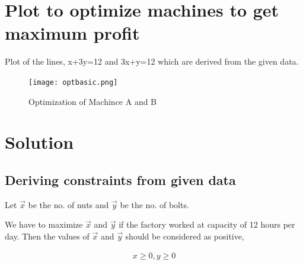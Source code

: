 \documentclass[journal,10pt,twocolumn]{article}
\begin{document}
\section{Plot to optimize machines to get maximum profit}
\vspace{0.25cm}
Plot of the lines, x+3y=12 and 3x+y=12 which are derived from the given data.
\begin{figure}[h]
\texttt{[image: optbasic.png]}
\caption{Optimization of Machince A and B}
\label{Optimization of Machince A and B}
\end{figure}

\section{Solution}
\subsection{Deriving constraints from given data}
\begin{flushleft}
Let $\vec{x}$ be the no. of nuts and $\vec{y}$ be the no. of bolts.\\
\end{flushleft}
\vspace{0.25cm}

\begin{flushleft}
We have to maximize $\vec{x}$ and $\vec{y}$ if the factory worked at capacity of 12 hours per day. Then the values of $\vec{x}$ and $\vec{y}$ should be considered as positive, \\
\end{flushleft}
\begin{align}
x\ge 0,   y\ge 0
\end{align}
\end{document}
